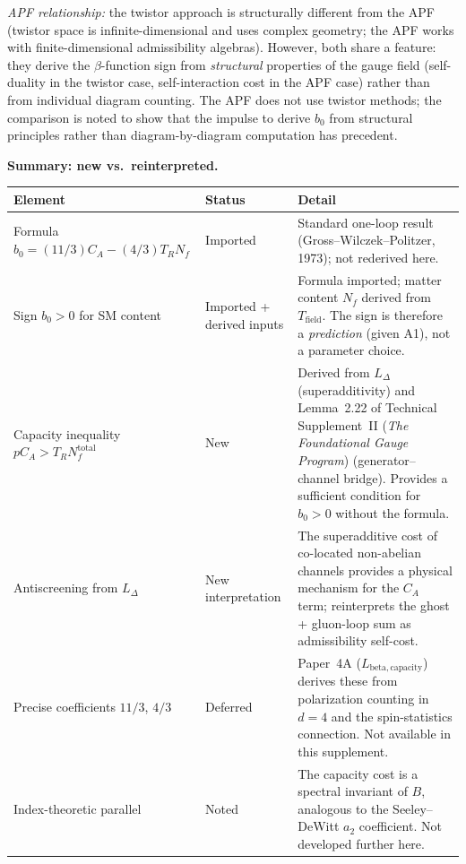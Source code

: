 \documentclass[11pt]{article}
\theoremstyle{definition}
\newcommand{\TSII}{Technical Supplement~II (\emph{The Foundational Gauge Program})}
\begin{document}
\textit{APF relationship:} the twistor approach is structurally
different from the APF (twistor space is infinite-dimensional and
uses complex geometry; the APF works with finite-dimensional
admissibility algebras).  However, both share a feature: they derive
the $\beta$-function sign from \emph{structural} properties of the
gauge field (self-duality in the twistor case, self-interaction cost
in the APF case) rather than from individual diagram counting.  The
APF does not use twistor methods; the comparison is noted to show
that the impulse to derive $b_0$ from structural principles rather
than diagram-by-diagram computation has precedent.

\smallskip\noindent\textbf{Summary: new vs.\ reinterpreted.}\quad

\begin{center}\small
\renewcommand{\arraystretch}{1.2}
\begin{tabular}{@{}p{4.5cm}p{1.8cm}p{6.5cm}@{}}
\toprule
\textbf{Element} & \textbf{Status} & \textbf{Detail} \\
\midrule
Formula $b_0 = (11/3)C_A - (4/3)T_R N_f$ &
  Imported &
  Standard one-loop result (Gross--Wilczek--Politzer, 1973);
  not rederived here. \\[3pt]
Sign $b_0 > 0$ for SM content &
  Imported + derived inputs &
  Formula imported; matter content $N_f$ derived from
  $T_{\mathrm{field}}$.  The sign is therefore a \emph{prediction}
  (given A1), not a parameter choice. \\[3pt]
Capacity inequality $p C_A > T_R N_f^{\mathrm{total}}$ &
  New &
  Derived from $L_\Delta$ (superadditivity) and
  Lemma~2.22 of \TSII{} (generator--channel bridge).
  Provides a sufficient condition for $b_0 > 0$ without the
  formula. \\[3pt]
Antiscreening from $L_\Delta$ &
  New interpretation &
  The superadditive cost of co-located non-abelian channels
  provides a physical mechanism for the $C_A$ term;
  reinterprets the ghost + gluon-loop sum as admissibility
  self-cost. \\[3pt]
Precise coefficients $11/3$, $4/3$ &
  Deferred &
  Paper~4A ($L_{\mathrm{beta,capacity}}$) derives these from
  polarization counting in $d = 4$ and the spin-statistics
  connection.  Not available in this supplement. \\[3pt]
Index-theoretic parallel &
  Noted &
  The capacity cost is a spectral invariant of $B$, analogous
  to the Seeley--DeWitt $a_2$ coefficient.  Not developed
  further here. \\
\bottomrule
\end{tabular}
\end{center}
\end{document}
